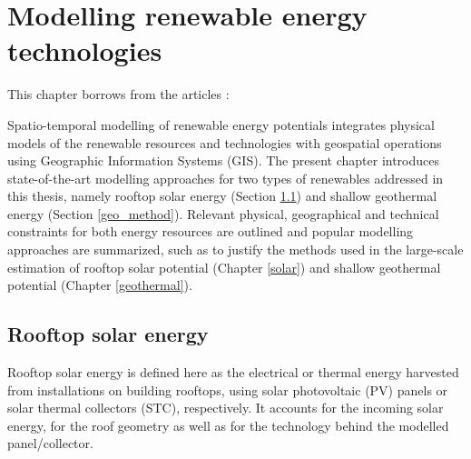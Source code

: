
\chapter{Modelling renewable energy technologies}
\label{methods_physical}

\vspace{-15pt} %
\begin{tcolorbox}[enhanced,width=\textwidth,size=fbox,
        sharp corners,colframe=black!5!white,drop fuzzy shadow southeast,
        boxrule=3mm, parbox=false] 
        
This chapter borrows from the articles \citep{walch_big_2020,walch_quantifying_2021}:

\qquad {}

\qquad {}
\end{tcolorbox}

Spatio-temporal modelling of renewable energy potentials integrates physical models of the renewable resources and technologies with geospatial operations using Geographic Information Systems (GIS).
The present chapter introduces state-of-the-art modelling approaches for two types of renewables addressed in this thesis, namely rooftop solar energy (Section \ref{method_solar}) and shallow geothermal energy (Section \ref{geo_method}). 
Relevant physical, geographical and technical constraints for both energy resources are outlined and popular modelling approaches are summarized, such as to justify the methods used in the large-scale estimation of rooftop solar potential (Chapter \ref{solar}) and shallow geothermal potential (Chapter \ref{geothermal}).

\section{Rooftop solar energy}
\label{method_solar}

Rooftop solar energy is defined here as the electrical or thermal energy harvested from installations on building rooftops, using solar photovoltaic (PV) panels or solar thermal collectors (STC), respectively. It accounts for the incoming solar energy, for the roof geometry as well as for the technology behind the modelled panel/collector. 


